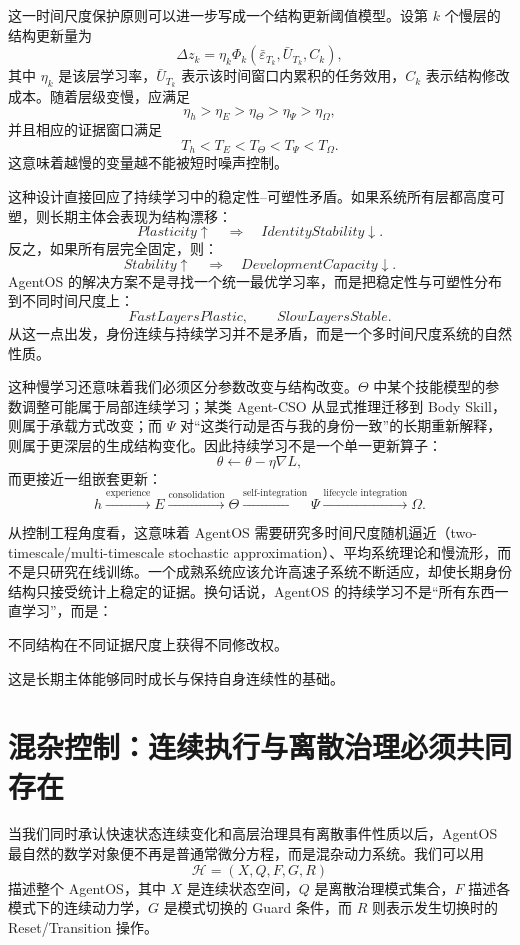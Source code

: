 这一时间尺度保护原则可以进一步写成一个结构更新阈值模型。设第 $k$ 个慢层的结构更新量为
\[
\Delta z_k
=
\eta_k
\Phi_k
\left(
\bar{\varepsilon}_{T_k},
\bar{U}_{T_k},
C_k
\right),
\]
其中 $\eta_k$ 是该层学习率，$\bar{U}_{T_k}$ 表示该时间窗口内累积的任务效用，$C_k$ 表示结构修改成本。随着层级变慢，应满足
\[
\eta_h
>
\eta_E
>
\eta_\Theta
>
\eta_\Psi
>
\eta_\Omega,
\]
并且相应的证据窗口满足
\[
T_h
<
T_E
<
T_\Theta
<
T_\Psi
<
T_\Omega.
\]
这意味着越慢的变量越不能被短时噪声控制。

这种设计直接回应了持续学习中的稳定性--可塑性矛盾。如果系统所有层都高度可塑，则长期主体会表现为结构漂移：
\[
Plasticity\uparrow
\quad\Rightarrow\quad
IdentityStability\downarrow.
\]
反之，如果所有层完全固定，则：
\[
Stability\uparrow
\quad\Rightarrow\quad
DevelopmentCapacity\downarrow.
\]
AgentOS 的解决方案不是寻找一个统一最优学习率，而是把稳定性与可塑性分布到不同时间尺度上：
\[
\boxed{
FastLayersPlastic,\qquad
SlowLayersStable.
}
\]
从这一点出发，身份连续与持续学习并不是矛盾，而是一个多时间尺度系统的自然性质。

这种慢学习还意味着我们必须区分参数改变与结构改变。$\Theta$ 中某个技能模型的参数调整可能属于局部连续学习；某类 Agent-CSO 从显式推理迁移到 Body Skill，则属于承载方式改变；而 $\Psi$ 对``这类行动是否与我的身份一致''的长期重新解释，则属于更深层的生成结构变化。因此持续学习不是一个单一更新算子：
\[
\theta\leftarrow\theta-\eta\nabla L,
\]
而更接近一组嵌套更新：
\[
h
\xrightarrow{\text{experience}}
E
\xrightarrow{\text{consolidation}}
\Theta
\xrightarrow{\text{self-integration}}
\Psi
\xrightarrow{\text{lifecycle integration}}
\Omega.
\]

从控制工程角度看，这意味着 AgentOS 需要研究多时间尺度随机逼近（two-timescale/multi-timescale stochastic approximation）、平均系统理论和慢流形，而不是只研究在线训练。一个成熟系统应该允许高速子系统不断适应，却使长期身份结构只接受统计上稳定的证据。换句话说，AgentOS 的持续学习不是``所有东西一直学习''，而是：
\begin{statementbox}
不同结构在不同证据尺度上获得不同修改权。
\end{statementbox}
这是长期主体能够同时成长与保持自身连续性的基础。

\section{混杂控制：连续执行与离散治理必须共同存在}

当我们同时承认快速状态连续变化和高层治理具有离散事件性质以后，AgentOS 最自然的数学对象便不再是普通常微分方程，而是混杂动力系统。我们可以用
\[
\mathcal H
=
(X,Q,F,G,R)
\]
描述整个 AgentOS，其中 $X$ 是连续状态空间，$Q$ 是离散治理模式集合，$F$ 描述各模式下的连续动力学，$G$ 是模式切换的 Guard 条件，而 $R$ 则表示发生切换时的 Reset/Transition 操作。

